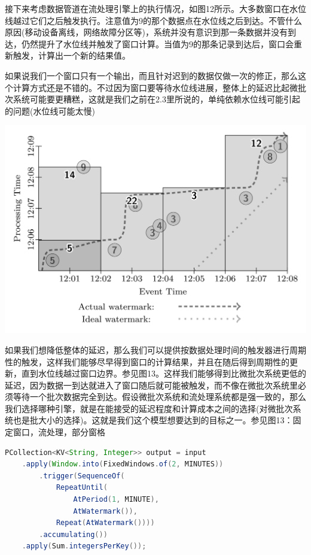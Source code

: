 \documentclass[oneside]{ctexbook}
\begin{document}
接下来考虑数据管道在流处理引擎上的执行情况，如图12所示。大多数窗口在水位线越过它们之后触发执行。注意值为9的那个数据点在水位线之后到达。不管什么原因(移动设备离线，网络故障分区等)，系统并没有意识到那一条数据并没有到达，仍然提升了水位线并触发了窗口计算。当值为9的那条记录到达后，窗口会重新触发，计算出一个新的结果值。

如果说我们一个窗口只有一个输出，而且针对迟到的数据仅做一次的修正，那么这个计算方式还是不错的。不过因为窗口要等待水位线进展，整体上的延迟比起微批次系统可能要更糟糕，这就是我们之前在2.3里所说的，单纯依赖水位线可能引起的问题(水位线可能太慢)

\noindent \includegraphics[width=\textwidth]{fixedwindowsstreaming.png}

如果我们想降低整体的延迟，那么我们可以提供按数据处理时间的触发器进行周期性的触发，这样我们能够尽早得到窗口的计算结果，并且在随后得到周期性的更新，直到水位线越过窗口边界。参见图13。这样我们能够得到比微批次系统更低的延迟，因为数据一到达就进入了窗口随后就可能被触发，而不像在微批次系统里必须等待一个批次数据完全到达。假设微批次系统和流处理系统都是强一致的，那么我们选择哪种引擎，就是在能接受的延迟程度和计算成本之间的选择(对微批次系统也是批大小的选择)。这就是我们这个模型想要达到的目标之一。参见图13：固定窗口，流处理，部分窗格

\begin{lstlisting}[language=java]
PCollection<KV<String, Integer>> output = input
    .apply(Window.into(FixedWindows.of(2, MINUTES))
        .trigger(SequenceOf(
            RepeatUntil(
                AtPeriod(1, MINUTE),
                AtWatermark()),
            Repeat(AtWatermark())))
        .accumulating())
    .apply(Sum.integersPerKey());
\end{lstlisting}
\end{document}

